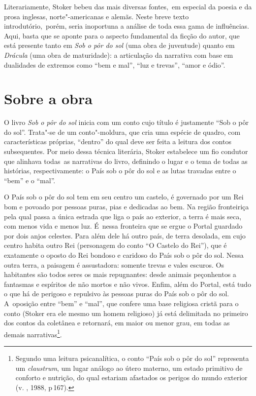 Literariamente, Stoker bebeu das mais diversas fontes,~em especial da
poesia e da prosa inglesas, norte"-americanas e alemãs. Neste breve texto
introdutório,~porém, seria inoportuna a análise de toda essa gama de
influências. Aqui, basta que se aponte para o aspecto fundamental da
ficção do autor, que está presente tanto em \emph{Sob o pôr do sol} (uma
obra de juventude) quanto em \emph{Drácula} (uma obra de maturidade): a
articulação da narrativa com base em dualidades de extremos como ``bem e
mal'', ``luz e trevas'', ``amor e ódio''.

\section{Sobre a obra}

O livro \emph{Sob o pôr do sol} inicia com um conto cujo título é
justamente ``Sob o pôr do sol''. Trata"-se de um conto"-moldura, que cria
uma espécie de quadro, com características próprias, ``dentro'' do qual
deve ser feita a leitura dos contos subsequentes. Por meio dessa técnica
literária, Stoker estabelece um fio condutor que alinhava todas~as
narrativas do livro, definindo o lugar e o tema de todas as histórias,
respectivamente: o País sob o pôr do sol e as lutas travadas entre o
``bem'' e o ``mal''.

O País sob o pôr do sol tem em seu centro um castelo, é governado por um
Rei bom e povoado por pessoas puras, pias e dedicadas ao bem. Na região
fronteiriça pela qual passa a única estrada que liga o país ao exterior, a
terra é mais seca, com menos vida e menos luz. É~nessa fronteira que se
ergue o Portal guardado por dois anjos celestes. Para além dele há outro
país, de terra desolada, em cujo centro habita outro Rei (personagem do
conto ``O Castelo do Rei''), que é exatamente o oposto do Rei bondoso e
caridoso do País sob o pôr do sol. Nessa outra terra, a paisagem é
assustadora: somente trevas e vales escuros. Os habitantes são todos
seres os mais repugnantes: desde animais peçonhentos a fantasmas e
espíritos de não mortos e não vivos. Enfim, além do Portal, está tudo o
que há de perigoso e repulsivo às pessoas puras do País sob o pôr do
sol. A~oposição entre ``bem'' e ``mal'', que confere uma base religiosa
cristã para o conto (Stoker era ele mesmo um homem religioso) já está
delimitada no primeiro dos contos da coletânea e retornará, em maior ou
menor grau, em todas as demais narrativas\footnote{Segundo uma leitura psicanalítica, o conto
``País sob o pôr do sol'' representa um \emph{claustrum}, um lugar
análogo ao útero materno, um estado primitivo de conforto e nutrição, do
qual estariam afastados os perigos do mundo exterior (v. , 1988,
p\,167).}.

